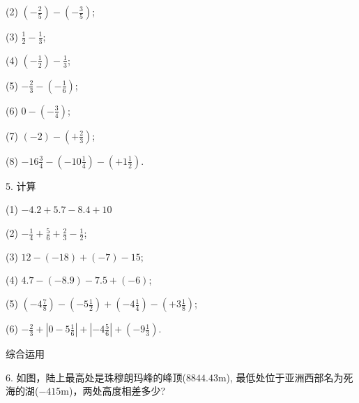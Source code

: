 \documentclass[UTF8]{article}
\begin{document}
(2) $(-\frac{2}{5})-(-\frac{3}{5})$;

(3) $\frac{1}{2}-\frac{1}{3}$;

(4) $(-\frac{1}{2})-\frac{1}{3}$;

(5) $-\frac{2}{3}-(-\frac{1}{6})$;

(6) $0-(-\frac{3}{4})$;

(7) $(-2)-(+\frac{2}{3})$;

(8) $-16\frac{3}{4}-(-10\frac{1}{4})-(+1\frac{1}{2})$.

5. 计算

(1) $-4.2+5.7-8.4+10$

(2) $-\frac{1}{4}+\frac{5}{6}+\frac{2}{3}-\frac{1}{2}$;

(3) $12-(-18)+(-7)-15$;

(4) $4.7-(-8.9)-7.5+(-6)$;

(5) $(-4\frac{7}{8})-(-5\frac{1}{2})+(-4\frac{1}{4})-(+3\frac{1}{8})$;

(6) $-\frac{2}{3}+\left|0-5\frac{1}{6}\right|+\left|-4\frac{5}{6}\right|+(-9\frac{1}{3})$.

综合运用

6. 如图，陆上最高处是珠穆朗玛峰的峰顶($8844.43$m), 最低处位于亚洲西部名为死海的湖($-415$m)，两处高度相差多少?
\end{document}
